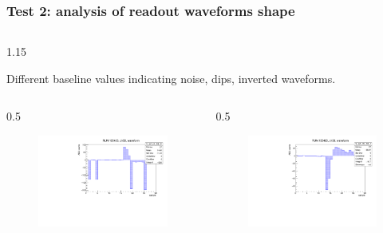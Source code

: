 \documentclass{beamer}
\begin{document}
 
\begin{frame}
    \frametitle{Test 2: analysis of readout waveforms shape}
    \vspace{-4mm}
    \begin{columns}
\begin{column}{1.15\framewidth}
    \setlength{\leftmargini}{1.2em}
 \begin{itemize}
{\footnotesize \item Different baseline values indicating noise, dips, inverted waveforms.}
  \end{itemize}
    \end{column}
    \end{columns}
        \vspace{-3mm}
    \begin{columns}
\begin{column}{0.5\framewidth}
         \begin{figure}[!h]
      \centering
      \hspace*{-2em}
      \includegraphics[width=\columnwidth]{figures/pdf/wf_ch58_1.pdf}
     \label{fig:normalhits}
\end{figure}
\end{column}
\begin{column}{0.5\framewidth}
      \begin{figure}[!h]
      \centering
            \hspace*{-1em}
\includegraphics[width=\columnwidth]{figures/pdf/wf_ch50_1.pdf}

\end{figure}
\end{column}
\end{columns}
\end{frame}
\end{document}
